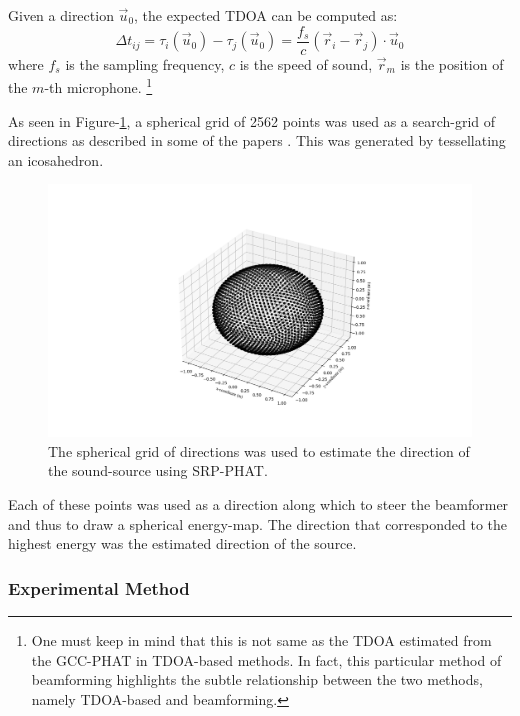 \documentclass[notitlepage]{report}
\begin{document}
Given a direction $\vec{u}_0$, the expected TDOA can be computed as:
\begin{equation}
\Delta t_{ij} = \tau_{i}(\vec{u}_0) - \tau_{j}(\vec{u}_0) = \frac{f_s}{c} \left( \vec{r}_i - \vec{r}_j \right) \cdot \vec{u}_0
\end{equation}
where $f_s$ is the sampling frequency, $c$ is the speed of sound, $\vec{r}_m$ is the position of the $m$-th microphone. \footnote{One must keep in mind that this is not same as the TDOA estimated from the GCC-PHAT in TDOA-based methods. In fact, this particular method of beamforming highlights the subtle relationship between the two methods, namely TDOA-based and beamforming.}

As seen in Figure-\ref{fig:srp_phat_grid}, a spherical grid of 2562 points was used as a search-grid of directions as described in some of the papers \cite{valin_localization_2004} \cite{valin_robust_2007}. This was generated by tessellating an icosahedron.

\begin{figure}[H]
\includegraphics[width=1\textwidth]{../Python/srp_phat/grid.png}
\centering
\caption{The spherical grid of directions was used to estimate the direction of the sound-source using SRP-PHAT.}
\label{fig:srp_phat_grid}
\centering
\end{figure}

Each of these points was used as a direction along which to steer the beamformer and thus to draw a spherical energy-map. The direction that corresponded to the highest energy was the estimated direction of the source.

\subsubsection{Experimental Method}
\end{document}
